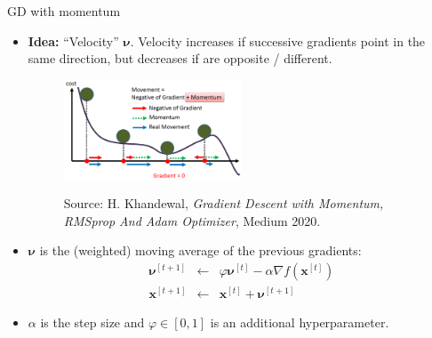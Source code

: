 \documentclass[11pt,compress,t,notes=noshow, xcolor=table]{beamer}
\begin{document}
\begin{vbframe}{GD with momentum}

\begin{itemize}
\item \textbf{Idea: } \enquote{Velocity} $\bm{\nu}$. Velocity increases if successive gradients point in the same direction, but decreases if are opposite / different. 

\begin{figure}
	\includegraphics[width = 0.5\textwidth]{figure_man/momentum_illustration_medium.png} \\
	\begin{footnotesize}
	Source: H. Khandewal, \emph{Gradient Descent with Momentum, RMSprop And Adam Optimizer}, Medium 2020. 
	\end{footnotesize}
\end{figure}

\item $\bm{\nu}$ is the (weighted) moving average of the previous gradients:
\begin{eqnarray*}
        \bm{\nu}^{[t+1]} &\leftarrow& \varphi \bm{\nu}^{[t]} - \alpha \nabla f(\bm{x}^{[t]}) \\
        \bm{x}^{[t + 1]} &\leftarrow&  \bm{x}^{[t]} + \bm{\nu}^{[t+1]}
\end{eqnarray*}
\item $\alpha$ is the step size and $\varphi \in [0,1]$ is an additional hyperparameter. 
\end{itemize}

\framebreak



\end{vbframe}
\end{document}
